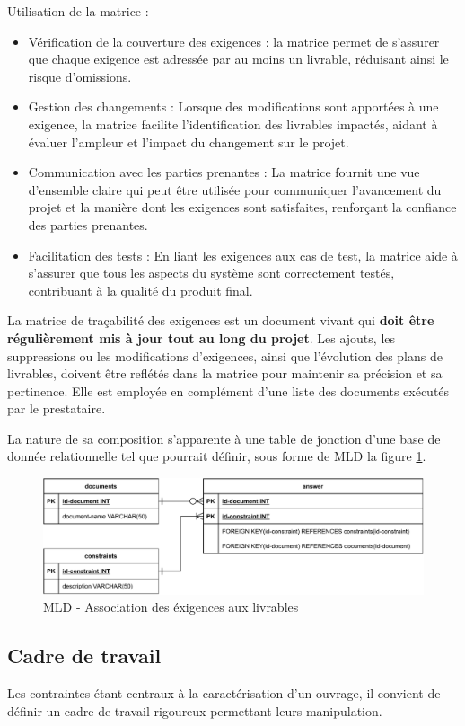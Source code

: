 \documentclass[a4paper,12pt]{article}
\begin{document}
Utilisation de la matrice :
\begin{itemize}
\item Vérification de la couverture des exigences : la matrice permet de s'assurer que chaque exigence est adressée par au moins un livrable, réduisant ainsi le risque d'omissions.
\item Gestion des changements : Lorsque des modifications sont apportées à une exigence, la matrice facilite l'identification des livrables impactés, aidant à évaluer l'ampleur et l'impact du changement sur le projet.
\item Communication avec les parties prenantes : La matrice fournit une vue d'ensemble claire qui peut être utilisée pour communiquer l'avancement du projet et la manière dont les exigences sont satisfaites, renforçant la confiance des parties prenantes.
\item Facilitation des tests : En liant les exigences aux cas de test, la matrice aide à s'assurer que tous les aspects du système sont correctement testés, contribuant à la qualité du produit final.
\end{itemize}

La matrice de traçabilité des exigences est un document vivant qui \textbf{doit être régulièrement mis à jour tout au long du projet}. Les ajouts, les suppressions ou les modifications d'exigences, ainsi que l'évolution des plans de livrables, doivent être reflétés dans la matrice pour maintenir sa précision et sa pertinence.
Elle est employée en complément d'une liste des documents exécutés par le prestataire.

La nature de sa composition s'apparente à une table de jonction d'une base de donnée relationnelle tel que pourrait définir, sous forme de MLD la figure \ref{fig:org6ad7b5b}.

\begin{figure}[htbp]
\centering
\includegraphics[width=.9\linewidth]{./svg/db-exigences-lde.pdf}
\caption{\label{fig:org6ad7b5b}MLD - Association des éxigences aux livrables}
\end{figure}
\subsection{Cadre de travail}
\label{sec:org6170e3a}
Les contraintes étant centraux à la caractérisation d'un ouvrage, il convient de définir un cadre de travail rigoureux permettant leurs manipulation.
\end{document}
